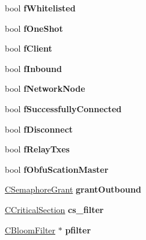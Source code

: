 \begin{DoxyCompactItemize}
\mbox{\label{class_c_node_ad3096c14b54aa39a02edb63a4a734c3e}} 
bool {\bfseries f\+Whitelisted}
\item 
\mbox{\label{class_c_node_a2bb91c9968a9f855c05b1121100a8797}} 
bool {\bfseries f\+One\+Shot}
\item 
\mbox{\label{class_c_node_a721e2470c2c961b7599768a14be68781}} 
bool {\bfseries f\+Client}
\item 
\mbox{\label{class_c_node_a64b2550ec558b6106ebc122d450ad35b}} 
bool {\bfseries f\+Inbound}
\item 
\mbox{\label{class_c_node_a933adb2b192939545a01d602b1d7b53a}} 
bool {\bfseries f\+Network\+Node}
\item 
\mbox{\label{class_c_node_ab58c1772b2698e348d86002f34254119}} 
bool {\bfseries f\+Successfully\+Connected}
\item 
\mbox{\label{class_c_node_af2f7ea958313974e8a948292f060922e}} 
bool {\bfseries f\+Disconnect}
\item 
\mbox{\label{class_c_node_ab387bb0c4ffd42e3f0aea233dca0e301}} 
bool {\bfseries f\+Relay\+Txes}
\item 
\mbox{\label{class_c_node_a67cfe0584c55af4de7868136c3fd48b0}} 
bool {\bfseries f\+Obfu\+Scation\+Master}
\item 
\mbox{\label{class_c_node_a4bb25f8bdeeaff5e8cb08abc97bbc44d}} 
\mbox{\hyperlink{class_c_semaphore_grant}{C\+Semaphore\+Grant}} {\bfseries grant\+Outbound}
\item 
\mbox{\label{class_c_node_a66aeed3b6534635d031dff3eee9538de}} 
\mbox{\hyperlink{class_annotated_mixin}{C\+Critical\+Section}} {\bfseries cs\+\_\+filter}
\item 
\mbox{\label{class_c_node_a2e28bf088e56fc9d30e99e9de6587743}} 
\mbox{\hyperlink{class_c_bloom_filter}{C\+Bloom\+Filter}} $\ast$ {\bfseries pfilter}
\item 

\end{DoxyCompactItemize}
